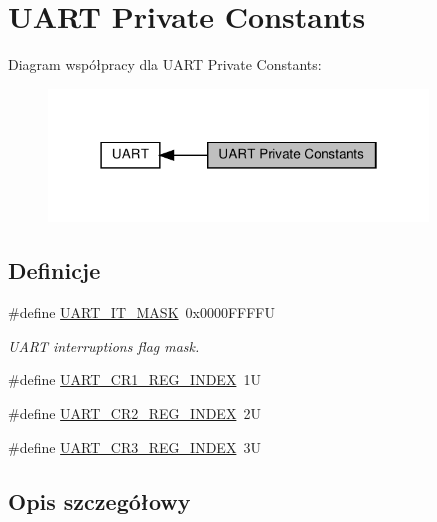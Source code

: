 \hypertarget{group___u_a_r_t___private___constants}{}\section{U\+A\+RT Private Constants}
\label{group___u_a_r_t___private___constants}
Diagram współpracy dla U\+A\+RT Private Constants\+:\nopagebreak
\begin{figure}[H]
\begin{center}
\leavevmode
\includegraphics[width=286pt]{group___u_a_r_t___private___constants}
\end{center}
\end{figure}
\subsection*{Definicje}
\begin{DoxyCompactItemize}
\item 
\#define \hyperlink{group___u_a_r_t___private___constants_ga869439269c26e8dee93d49b1c7e67448}{U\+A\+R\+T\+\_\+\+I\+T\+\_\+\+M\+A\+SK}~0x0000\+F\+F\+F\+FU
\begin{DoxyCompactList}\small\item\em U\+A\+RT interruptions flag mask. \end{DoxyCompactList}\item 
\#define \hyperlink{group___u_a_r_t___private___constants_ga5917bcb19b2dab202b8cbfa82520b93e}{U\+A\+R\+T\+\_\+\+C\+R1\+\_\+\+R\+E\+G\+\_\+\+I\+N\+D\+EX}~1U
\item 
\#define \hyperlink{group___u_a_r_t___private___constants_ga3a8b0ee44c75493eb001e60a9876e586}{U\+A\+R\+T\+\_\+\+C\+R2\+\_\+\+R\+E\+G\+\_\+\+I\+N\+D\+EX}~2U
\item 
\#define \hyperlink{group___u_a_r_t___private___constants_gac9cb22110b40ab2261468436e3038524}{U\+A\+R\+T\+\_\+\+C\+R3\+\_\+\+R\+E\+G\+\_\+\+I\+N\+D\+EX}~3U
\end{DoxyCompactItemize}


\subsection{Opis szczegółowy}


